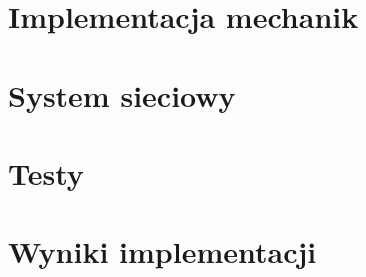 \section{Implementacja mechanik}

\section{System sieciowy}

\section{Testy}

\section{Wyniki implementacji}

